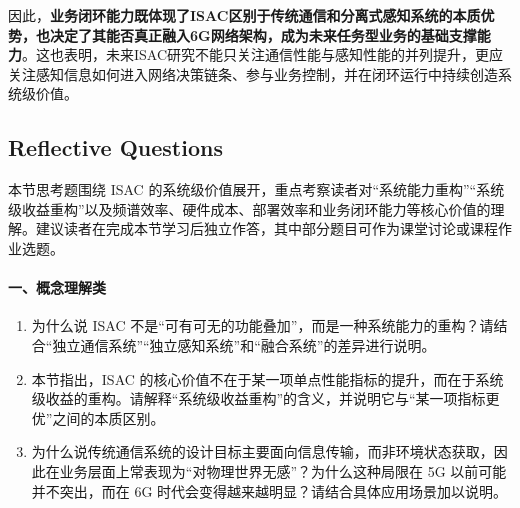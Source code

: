 因此，\textbf{业务闭环能力既体现了ISAC区别于传统通信和分离式感知系统的本质优势，也决定了其能否真正融入6G网络架构，成为未来任务型业务的基础支撑能力}。这也表明，未来ISAC研究不能只关注通信性能与感知性能的并列提升，更应关注感知信息如何进入网络决策链条、参与业务控制，并在闭环运行中持续创造系统级价值。

\subsection{Reflective Questions}
\label{subsec:ch1.2-reflect-questions}

本节思考题围绕 ISAC 的系统级价值展开，重点考察读者对“系统能力重构”“系统级收益重构”以及频谱效率、硬件成本、部署效率和业务闭环能力等核心价值的理解。建议读者在完成本节学习后独立作答，其中部分题目可作为课堂讨论或课程作业选题。

\paragraph{一、概念理解类}
\begin{enumerate}
    \item 为什么说 ISAC 不是“可有可无的功能叠加”，而是一种系统能力的重构？请结合“独立通信系统”“独立感知系统”和“融合系统”的差异进行说明。

    \item 本节指出，ISAC 的核心价值不在于某一项单点性能指标的提升，而在于系统级收益的重构。请解释“系统级收益重构”的含义，并说明它与“某一项指标更优”之间的本质区别。

    \item 为什么说传统通信系统的设计目标主要面向信息传输，而非环境状态获取，因此在业务层面上常表现为“对物理世界无感”？为什么这种局限在 5G 以前可能并不突出，而在 6G 时代会变得越来越明显？请结合具体应用场景加以说明。
\end{enumerate}


